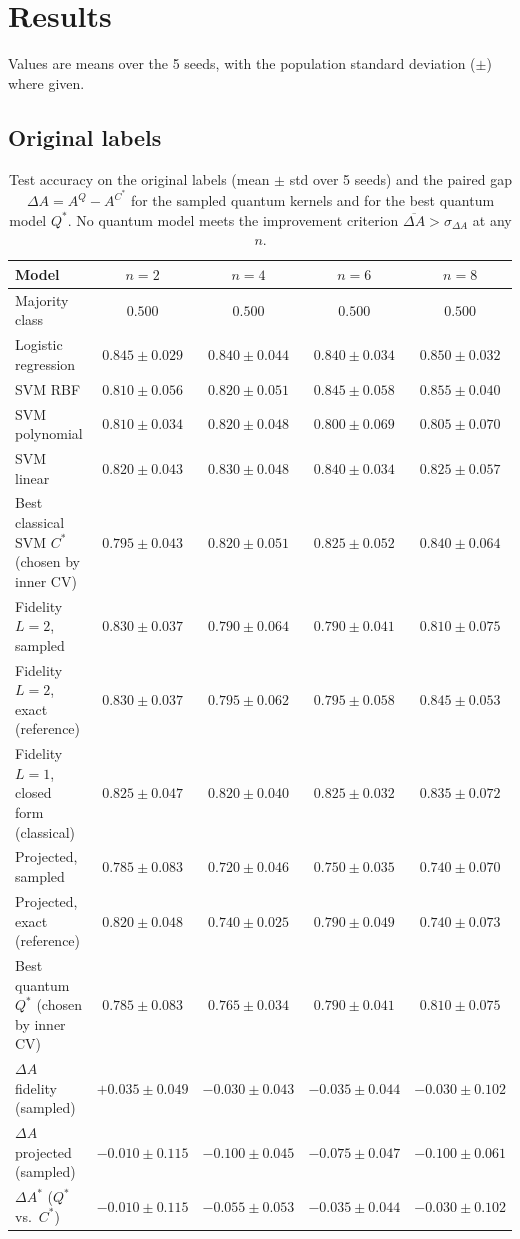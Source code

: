 \documentclass[conference]{IEEEtran}
\begin{document}
\section{Results}
Values are means over the 5 seeds, with the population standard deviation ($\pm$) where given.

\subsection{Original labels}

\begin{table}[t]
\centering
\caption{Test accuracy on the original labels (mean $\pm$ std over 5 seeds) and the paired gap $\Delta A=A^Q-A^{C^\ast}$ for the sampled quantum kernels and for the best quantum model $Q^\ast$. No quantum model meets the improvement criterion $\overline{\Delta A}>\sigma_{\Delta A}$ at any $n$.}
\label{tab:orig}
\footnotesize
\begin{tabular}{@{}lcccc@{}}
\toprule
Model & $n=2$ & $n=4$ & $n=6$ & $n=8$ \\
\midrule
Majority class & $0.500$ & $0.500$ & $0.500$ & $0.500$ \\
Logistic regression & $0.845\pm0.029$ & $0.840\pm0.044$ & $0.840\pm0.034$ & $0.850\pm0.032$ \\
SVM RBF & $0.810\pm0.056$ & $0.820\pm0.051$ & $0.845\pm0.058$ & $0.855\pm0.040$ \\
SVM polynomial & $0.810\pm0.034$ & $0.820\pm0.048$ & $0.800\pm0.069$ & $0.805\pm0.070$ \\
SVM linear & $0.820\pm0.043$ & $0.830\pm0.048$ & $0.840\pm0.034$ & $0.825\pm0.057$ \\
Best classical SVM $C^\ast$ (chosen by inner CV) & $0.795\pm0.043$ & $0.820\pm0.051$ & $0.825\pm0.052$ & $0.840\pm0.064$ \\
\midrule
Fidelity $L=2$, sampled & $0.830\pm0.037$ & $0.790\pm0.064$ & $0.790\pm0.041$ & $0.810\pm0.075$ \\
Fidelity $L=2$, exact (reference) & $0.830\pm0.037$ & $0.795\pm0.062$ & $0.795\pm0.058$ & $0.845\pm0.053$ \\
Fidelity $L=1$, closed form (classical) & $0.825\pm0.047$ & $0.820\pm0.040$ & $0.825\pm0.032$ & $0.835\pm0.072$ \\
Projected, sampled & $0.785\pm0.083$ & $0.720\pm0.046$ & $0.750\pm0.035$ & $0.740\pm0.070$ \\
Projected, exact (reference) & $0.820\pm0.048$ & $0.740\pm0.025$ & $0.790\pm0.049$ & $0.740\pm0.073$ \\
Best quantum $Q^\ast$ (chosen by inner CV) & $0.785\pm0.083$ & $0.765\pm0.034$ & $0.790\pm0.041$ & $0.810\pm0.075$ \\
\midrule
$\Delta A$ fidelity (sampled) & $+0.035\pm0.049$ & $-0.030\pm0.043$ & $-0.035\pm0.044$ & $-0.030\pm0.102$ \\
$\Delta A$ projected (sampled) & $-0.010\pm0.115$ & $-0.100\pm0.045$ & $-0.075\pm0.047$ & $-0.100\pm0.061$ \\
$\Delta A^\ast$ ($Q^\ast$ vs.\ $C^\ast$) & $-0.010\pm0.115$ & $-0.055\pm0.053$ & $-0.035\pm0.044$ & $-0.030\pm0.102$ \\
\bottomrule
\end{tabular}
\end{table}
\end{document}
